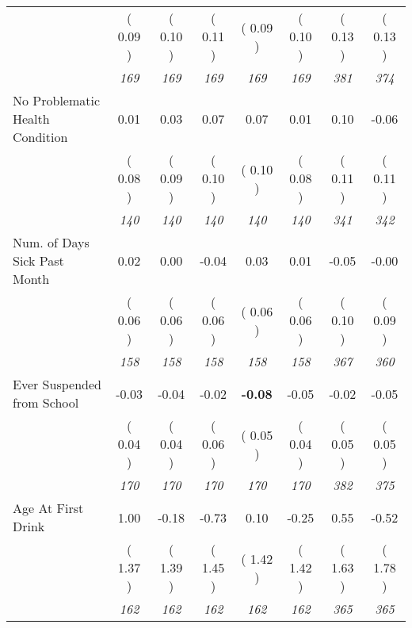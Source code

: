 \begin{tabular}{l c c c c c c c}
& (     0.09 ) & (     0.10 ) & (     0.11 ) & (     0.09 ) & (     0.10 ) & (     0.13 ) & (     0.13 ) \\
& \textit{ 169 } & \textit{ 169 } & \textit{ 169 } & \textit{ 169 } & \textit{ 169 } & \textit{ 381 } & \textit{ 374 } \\
No Problematic Health Condition &      0.01 &      0.03 &      0.07 &      0.07 &      0.01 &      0.10 &     -0.06 \\
& (     0.08 ) & (     0.09 ) & (     0.10 ) & (     0.10 ) & (     0.08 ) & (     0.11 ) & (     0.11 ) \\
& \textit{ 140 } & \textit{ 140 } & \textit{ 140 } & \textit{ 140 } & \textit{ 140 } & \textit{ 341 } & \textit{ 342 } \\
Num. of Days Sick Past Month &      0.02 &      0.00 &     -0.04 &      0.03 &      0.01 &     -0.05 &     -0.00 \\
& (     0.06 ) & (     0.06 ) & (     0.06 ) & (     0.06 ) & (     0.06 ) & (     0.10 ) & (     0.09 ) \\
& \textit{ 158 } & \textit{ 158 } & \textit{ 158 } & \textit{ 158 } & \textit{ 158 } & \textit{ 367 } & \textit{ 360 } \\
Ever Suspended from School &     -0.03 &     -0.04 &     -0.02 & \textbf{    -0.08} &     -0.05 &     -0.02 &     -0.05 \\
& (     0.04 ) & (     0.04 ) & (     0.06 ) & (     0.05 ) & (     0.04 ) & (     0.05 ) & (     0.05 ) \\
& \textit{ 170 } & \textit{ 170 } & \textit{ 170 } & \textit{ 170 } & \textit{ 170 } & \textit{ 382 } & \textit{ 375 } \\
Age At First Drink &      1.00 &     -0.18 &     -0.73 &      0.10 &     -0.25 &      0.55 &     -0.52 \\
& (     1.37 ) & (     1.39 ) & (     1.45 ) & (     1.42 ) & (     1.42 ) & (     1.63 ) & (     1.78 ) \\
& \textit{ 162 } & \textit{ 162 } & \textit{ 162 } & \textit{ 162 } & \textit{ 162 } & \textit{ 365 } & \textit{ 365 } \\
\bottomrule
\end{tabular}
